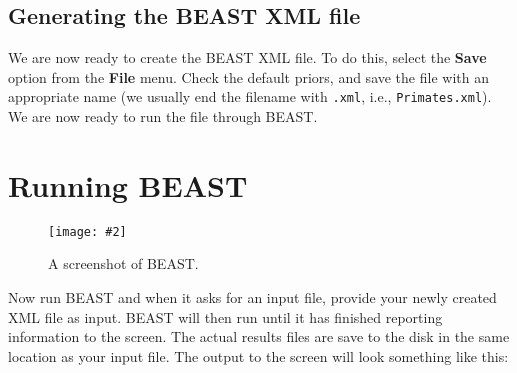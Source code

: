 \documentclass[12pt]{article}
\newcommand{\includeimage}[2][]{%
\texttt{[image: \#2]}
}
\begin{document}
\subsection{Generating the BEAST XML file }

We are now ready to create the BEAST XML file. To do this,
select the \textbf{Save} option from the \textbf{File} menu. 
Check the default priors, and save the file with an appropriate name
(we usually end the filename with \texttt{.xml}, i.e., \texttt{Primates.xml}).
We are now ready to run the file through BEAST. 

\section{Running BEAST }

\begin{figure}
\centering	
\includeimage[width=0.7\textwidth]{figures/BEAST}
\caption{A screenshot of BEAST.}
\label{fig:BEAST}
\end{figure}

Now run BEAST and when it asks for an input file, provide your newly
created XML file as input. BEAST will then run until it has finished
reporting information to the screen. The actual results files are
save to the disk in the same location as your input file. The output to the screen will
look something like this: 
\end{document}
